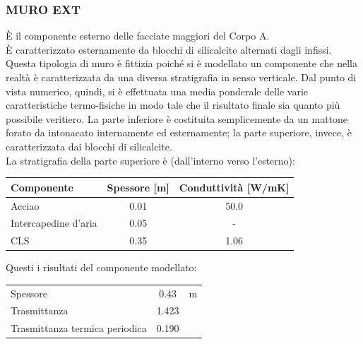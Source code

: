\subsubsection{MURO EXT}
È il componente esterno delle facciate maggiori del Corpo A. \\È caratterizzato esternamente da blocchi di silicalcite alternati dagli infissi. \\Questa tipologia di muro è fittizia poiché si è modellato un componente che nella realtà è caratterizzata da una diversa stratigrafia in senso verticale. Dal punto di vista numerico, quindi, si è effettuata una media ponderale delle varie caratteristiche termo-fisiche in modo tale che il risultato finale sia quanto più possibile veritiero. La parte inferiore è costituita semplicemente da un mattone forato da  intonacato internamente ed esternamente; la parte superiore, invece, è caratterizzata dai blocchi di silicalcite. \\ La stratigrafia della parte superiore è (dall'interno verso l'esterno):
\begin{center}
	\begin{tabular}{lcc}
		\toprule
		Componente & Spessore [m] & Conduttività [\si{W/mK}] \\
		\midrule
		Acciao & \num{0.01} & \num{50.0} \\
		Intercapedine d'aria & \num{0.05} & -\\
		CLS & \num{0.35} & \num{1.06} \\
		\bottomrule
	\end{tabular}
\end{center}
Questi i risultati del componente modellato:
\begin{center}
	\begin{tabular}{lcc}
		\toprule
		Spessore & \num{0.43} & \si{m}\\
		Trasmittanza & \num{1.423} & \trasm\\
		Trasmittanza termica periodica & \num{0.190} & \trasm\\
		\bottomrule
	\end{tabular}
\end{center}
